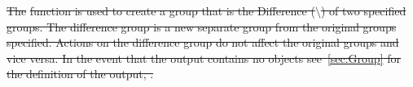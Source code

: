 \documentclass[12pt]{report} %
\providecommand{\DIFdeltex}[1]{{\protect\color{red}\sout{#1}}}                      %
\providecommand{\DIFdelbegin}{} %
\providecommand{\DIFdel}[1]{\texorpdfstring{\DIFdeltex{#1}}{}} %
\newcommand{\DIFscaledelfig}{0.5}
\newlength{\DIFdelgraphicswidth} %
\newlength{\DIFdelgraphicsheight} %
\newcommand{\DIFdelincludegraphics}[2][]{%
\sbox{\DIFdelgraphicsbox}{\DIFOincludegraphics[#1]{#2}}%
\settoboxwidth{\DIFdelgraphicswidth}{\DIFdelgraphicsbox} %
\settoboxtotalheight{\DIFdelgraphicsheight}{\DIFdelgraphicsbox} %
\scalebox{\DIFscaledelfig}{%
\parbox[b]{\DIFdelgraphicswidth}{\usebox{\DIFdelgraphicsbox}\\[-\baselineskip] \rule{\DIFdelgraphicswidth}{0em}}\llap{\resizebox{\DIFdelgraphicswidth}{\DIFdelgraphicsheight}{%
\setlength{\unitlength}{\DIFdelgraphicswidth}%
\begin{picture}(1,1)%
\thicklines\linethickness{2pt} %
{\color[rgb]{1,0,0}\put(0,0){\framebox(1,1){}}}%
{\color[rgb]{1,0,0}\put(0,0){\line( 1,1){1}}}%
{\color[rgb]{1,0,0}\put(0,1){\line(1,-1){1}}}%
\end{picture}%
}\hspace*{3pt}}} %
} %
\DeclareRobustCommand{\DIFdelbegin}{\DIFOdelbegin \let\includegraphics\DIFdelincludegraphics} %
\begin{document}
\DIFdelbegin %


\DIFdel{The }%
\DIFdel{function is used to create a group that is the Difference ($\setminus$) of two specified groups.
The difference group is a new separate group from the original groups specified.
Actions on the difference group do not affect the original groups and vice versa.
In the event that the output \textt{PWR_Grp} contains no objects see~\ref{sec:Group} for the definition of the output, \textt{PWR_Grp}.
}%

\end{document}

